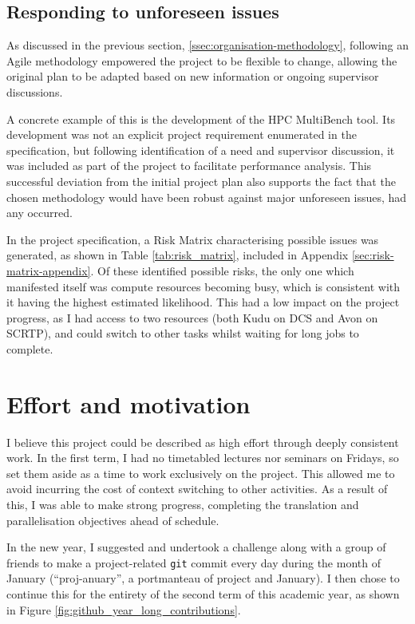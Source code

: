 \subsection{Responding to unforeseen issues}
\label{ssec:organisation-unforeseen-issues}

As discussed in the previous section, \ref{ssec:organisation-methodology}, following an Agile methodology empowered the project to be flexible to change, allowing the original plan to be adapted based on new information or ongoing supervisor discussions.

A concrete example of this is the development of the HPC MultiBench tool. Its development was not an explicit project requirement enumerated in the specification, but following identification of a need and supervisor discussion, it was included as part of the project to facilitate performance analysis. This successful deviation from the initial project plan also supports the fact that the chosen methodology would have been robust against major unforeseen issues, had any occurred.

In the project specification, a Risk Matrix characterising possible issues was generated, as shown in Table \ref{tab:risk_matrix}, included in Appendix \ref{sec:risk-matrix-appendix}. Of these identified possible risks, the only one which manifested itself was compute resources becoming busy, which is consistent with it having the highest estimated likelihood. This had a low impact on the project progress, as I had access to two resources (both Kudu on DCS and Avon on SCRTP), and could switch to other tasks whilst waiting for long jobs to complete.

\section{Effort and motivation}
\label{sec:effort-and-motivation}

I believe this project could be described as high effort through deeply consistent work. In the first term, I had no timetabled lectures nor seminars on Fridays, so set them aside as a time to work exclusively on the project. This allowed me to avoid incurring the cost of context switching to other activities. As a result of this, I was able to make strong progress, completing the translation and parallelisation objectives ahead of schedule.

In the new year, I suggested and undertook a challenge along with a group of friends to make a project-related \texttt{git} commit every day during the month of January (``proj-anuary'', a portmanteau of project and January). I then chose to continue this for the entirety of the second term of this academic year, as shown in Figure \ref{fig:github_year_long_contributions}.

